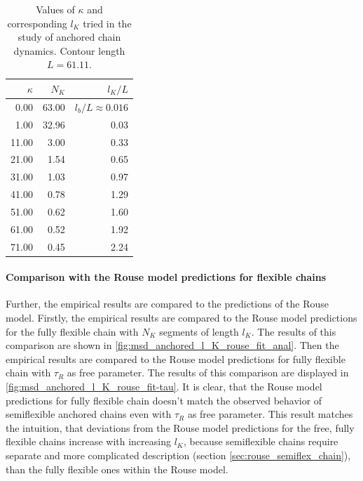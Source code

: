 \documentclass[
    paper=A4,pagesize=automedia,fontsize=12pt,
    BCOR=15mm,DIV=22,
    twoside,headinclude,footinclude=false,
    fleqn,             %
    bibliography=totocnumbered,          %
    listof=totoc,                %
    listof=flat,                 %
    cleardoublepage=empty      %
    numbers=endperiod
]{scrartcl}
\begin{document}
\begin{table}
    
    \centering
    \begin{tabular}{rrr}
        \toprule
        $\kappa$ & $N_K$ & $l_K/L$ \\
        \midrule
        0.00 & 63.00 & $l_b/L \approx 0.016$  \\
        1.00 & 32.96 & 0.03 \\
        11.00 & 3.00 & 0.33 \\
        21.00 & 1.54 & 0.65 \\
        31.00 & 1.03 & 0.97 \\
        41.00 & 0.78 & 1.29 \\
        51.00 & 0.62 & 1.60 \\
        61.00 & 0.52 & 1.92 \\
        71.00 & 0.45 & 2.24 \\
        \bottomrule
        \end{tabular}
    \caption{
        Values of $\kappa$ and corresponding $l_K$ tried in the study
        of anchored chain dynamics. Contour length $L=61.11$.
        }
    \label{table:kappa_values}
\end{table}

\FloatBarrier

\paragraph{Comparison with the Rouse model predictions for flexible chains}

Further, the empirical results are compared to the predictions of the Rouse model.
Firstly, the empirical results are compared to the Rouse model predictions for the fully
flexible chain with $N_K$ segments of length $l_K$. The results of this comparison are shown
in \autoref{fig:msd_anchored_l_K_rouse_fit_anal}. Then the empirical 
results are compared to the Rouse model predictions for fully flexible chain 
with $\tau_R$ as free parameter. The results of this comparison
are displayed in \autoref{fig:msd_anchored_l_K_rouse_fit-tau}. It is clear, 
that the Rouse model predictions for fully flexible chain doesn't match
the observed behavior of semiflexible anchored chains even with $\tau_R$ as 
free parameter. This result matches the intuition, that deviations from  
the Rouse model predictions for the free, fully flexible chains increase 
with increasing $l_K$, because semiflexible chains require separate and more complicated
description (section \ref{sec:rouse_semiflex_chain}), 
than the fully flexible ones within the Rouse model.
\end{document}
